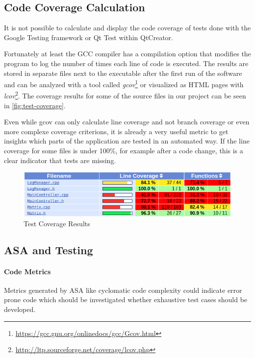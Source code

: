 \documentclass{scrreprt}
\begin{document}
\subsection{Code Coverage Calculation}

It is not possible to calculate and display the code coverage of tests done with the Google Testing framework or Qt Test within QtCreator.

Fortunately at least the GCC compiler has a compilation option that modifies the program to log the number of times each line of code is executed. The results are stored in separate files next to the executable after the first run of the software and can be analyzed with a tool called \textit{gcov}\footnote{\url{https://gcc.gnu.org/onlinedocs/gcc/Gcov.html}} or visualized as HTML pages with \textit{lcov}\footnote{\url{http://ltp.sourceforge.net/coverage/lcov.php}}. The coverage results for some of the source files in our project can be seen in \vref{fig:test-coverage}.

Even while gcov can only calculate line coverage and not branch coverage or even more complexe coverage criterions, it is already a very useful metric to get insights which parts of the application are tested in an automated way. If the line coverage for some files is under 100\%, for example after a code change, this is a clear indicator that tests are missing.

\begin{figure}[h]
	\centering
	\includegraphics[width=1.0\textwidth]{img/test-coverage}
	\caption[Test Coverage Results]{Test Coverage Results}
	\label{fig:test-coverage}
\end{figure}


\subsection{ASA and Testing}

\paragraph{Code Metrics} Metrics generated by ASA like cyclomatic code complexity could indicate error prone code which should be investigated whether exhaustive test cases should be developed.
\end{document}
